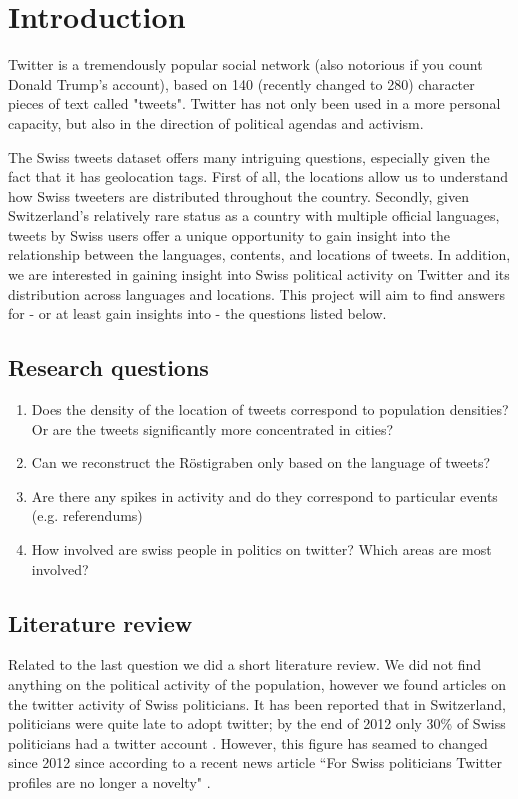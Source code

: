 \section{Introduction}

Twitter is a tremendously popular social network (also notorious if you count Donald Trump's account), based on 140 (recently changed to 280) character pieces of text called "tweets". Twitter has not only been used in a more personal capacity, but also in the direction of political agendas and activism.

The Swiss tweets dataset offers many intriguing questions, especially given the fact that it has geolocation tags. First of all, the locations allow us to understand how Swiss tweeters are distributed throughout the country. Secondly, given Switzerland's relatively rare status as a country with multiple official languages, tweets by Swiss users offer a unique opportunity to gain insight into the relationship between the languages, contents, and locations of tweets. In addition, we are interested in gaining insight into Swiss political activity on Twitter and its distribution across languages and locations. This project will aim to find answers for - or at least gain insights into - the questions listed below.

\subsection{Research questions}
\begin{enumerate}
\item Does the density of the location of tweets correspond to population densities? Or are the tweets significantly more concentrated in cities?
\item Can we reconstruct the R\"ostigraben only based on the language of tweets?
\item Are there any spikes in activity and do they correspond to particular events (e.g. referendums)
\item How involved are swiss people in politics on twitter? Which areas are most involved?
\end{enumerate}

\subsection{Literature review}

Related to the last question we did a short literature review. We did not find anything on the political activity of the population, however we found articles on the twitter activity of Swiss politicians. It has been reported that in Switzerland, politicians were quite late to adopt twitter; by the end of 2012 only 30\% of Swiss politicians had a twitter account \cite{rauchfleisch_special_2016}. However, this figure has seamed to changed since 2012 since according to a recent news article ``For Swiss politicians Twitter profiles are no longer a novelty" \cite{fichter_swiss_nodate}.


